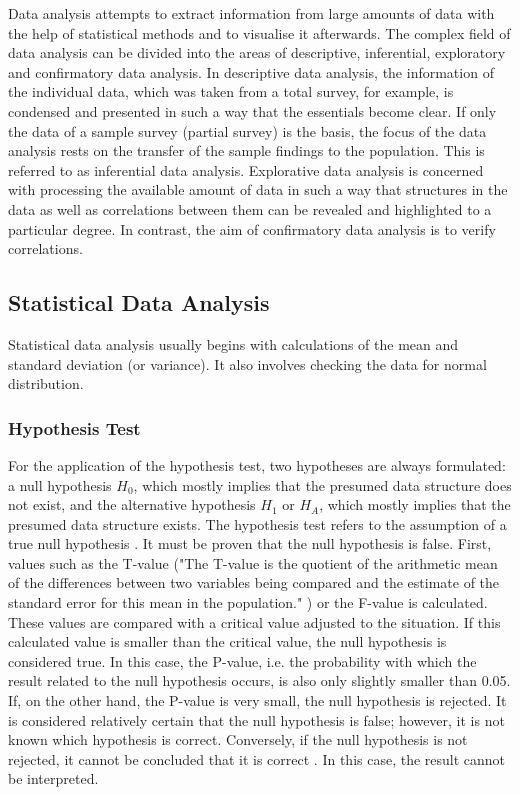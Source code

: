Data analysis attempts to extract information from large amounts of data with the help of statistical methods and to visualise it afterwards. The complex field of data analysis can be divided into the areas of descriptive, inferential, exploratory and confirmatory data analysis. In descriptive data analysis, the information of the individual data, which was taken from a total survey, for example, is condensed and presented in such a way that the essentials become clear. If only the data of a sample survey (partial survey) is the basis, the focus of the data analysis rests on the transfer of the sample findings to the population. This is referred to as inferential data analysis. Explorative data analysis is concerned with processing the available amount of data in such a way that structures in the data as well as correlations between them can be revealed and highlighted to a particular degree. In contrast, the aim of confirmatory data analysis is to verify correlations.

\subsection{Statistical Data Analysis}

Statistical data analysis usually begins with calculations of the mean and standard deviation (or variance). It also involves checking the data for normal distribution.

\subsubsection{Hypothesis Test}

For the application of the hypothesis test, two hypotheses are always formulated: a null hypothesis $H_0$, which mostly implies that the presumed data structure does not exist, and the alternative hypothesis $H_1$ or $H_A$, which mostly implies that the presumed data structure exists. The hypothesis test refers to the assumption of a true null hypothesis \cite{Akremi:2011}. It must be proven that the null hypothesis is false. First, values such as the T-value ("The T-value is the quotient of the arithmetic mean of the differences between two variables being compared and the estimate of the standard error for this mean in the population." \cite{Akremi:2011}) or the F-value is calculated. These values are compared with a critical value adjusted to the situation. If this calculated value is smaller than the critical value, the null hypothesis is considered true. In this case, the P-value, i.e. the probability with which the result related to the null hypothesis occurs, is also only slightly smaller than 0.05. If, on the other hand, the P-value is very small, the null hypothesis is rejected. It is considered relatively certain that the null hypothesis is false; however, it is not known which hypothesis is correct. Conversely, if the null hypothesis is not rejected, it cannot be concluded that it is correct \cite{Akremi:2011}. In this case, the result cannot be interpreted.

